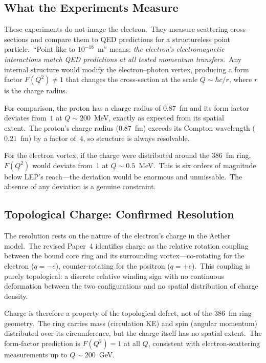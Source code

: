 \documentclass[12pt,letterpaper]{article}
\begin{document}
\subsection{What the Experiments Measure}

These experiments do not image the electron.\ They measure scattering
cross-sections and compare them to QED predictions for a structureless
point particle.\ ``Point-like to $10^{-18}$~m'' means: \emph{the
electron's electromagnetic interactions match QED predictions at all tested
momentum transfers.}\ Any internal structure would modify the
electron--photon vertex, producing a form factor $F(Q^2) \neq 1$ that
changes the cross-section at the scale $Q \sim \hbar c / r$, where $r$
is the charge radius.

For comparison, the proton has a charge radius of $0.87$~fm and its form
factor deviates from~$1$ at $Q \sim 200$~MeV, exactly as expected from
its spatial extent.\ The proton's charge radius ($0.87$~fm) exceeds its
Compton wavelength ($0.21$~fm) by a factor of~$4$, so structure is always
resolvable.

For the electron vortex, if the charge were distributed around the
$386$~fm ring, $F(Q^2)$ would deviate from~$1$ at $Q \sim 0.5$~MeV.\
This is six orders of magnitude below LEP's reach---the deviation would be
enormous and unmissable.\ The absence of any deviation is a genuine
constraint.

\subsection{Topological Charge: Confirmed Resolution}

The resolution rests on the nature of the electron's charge in the Aether
model.\ The revised Paper~4 \cite{otto-em} identifies charge as the
relative rotation coupling between the bound core ring and its surrounding
vortex---co-rotating for the electron ($q = -e$), counter-rotating for the
positron ($q = +e$).\ This coupling is purely topological: a discrete
relative winding sign with no continuous deformation between the two
configurations and no spatial distribution of charge density.

Charge is therefore a property of the topological defect, not of the
$386$~fm ring geometry.\ The ring carries mass (circulation KE) and spin
(angular momentum) distributed over its circumference, but the charge
itself has no spatial extent.\ The form-factor prediction is
$F(Q^2) = 1$ at all $Q$, consistent with electron-scattering measurements
up to $Q \sim 200$~GeV.
\end{document}
